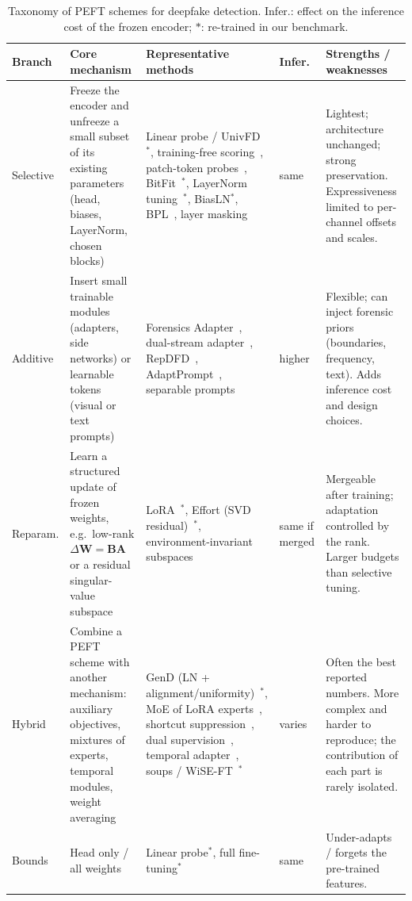 \documentclass[fonts]{icst}
\begin{document}
\begin{table}[!t]
\centering
\caption{Taxonomy of PEFT schemes for deepfake detection. Infer.: effect on the inference cost of the frozen encoder; $\ast$: re-trained in our benchmark.}
\label{tab:taxonomy}
\footnotesize
\begin{tabular}{>{\raggedright\arraybackslash}p{} >{\raggedright\arraybackslash}p{} >{\raggedright\arraybackslash}p{} >{\raggedright\arraybackslash}p{} >{\raggedright\arraybackslash}p{}}
\toprule
\textbf{Branch} & \textbf{Core mechanism} & \textbf{Representative methods} & \textbf{Infer.} & \textbf{Strengths / weaknesses} \\
\midrule
Selective & Freeze the encoder and unfreeze a small subset of its existing parameters (head, biases, LayerNorm, chosen blocks) & Linear probe / UnivFD~\cite{ojha2023universal}$^\ast$, training-free scoring~\cite{tsai2024trainingfree}, patch-token probes~\cite{abdullah2026tap}, BitFit~\cite{benzaken2022bitfit}$^\ast$, LayerNorm tuning~\cite{yermakov2025clip}$^\ast$, BiasLN$^\ast$, BPL~\cite{xu2026bpl}, layer masking~\cite{zhang2026layermask} & same & Lightest; architecture unchanged; strong preservation. Expressiveness limited to per-channel offsets and scales. \\
Additive & Insert small trainable modules (adapters, side networks) or learnable tokens (visual or text prompts) & Forensics Adapter~\cite{cui2025forada}, dual-stream adapter~\cite{liao2026dfa}, RepDFD~\cite{lin2025repdfd}, AdaptPrompt~\cite{jiang2026adaptprompt}, separable prompts~\cite{yang2026separable} & higher & Flexible; can inject forensic priors (boundaries, frequency, text). Adds inference cost and design choices. \\
Reparam. & Learn a structured update of frozen weights, e.g.\ low-rank $\Delta\mathbf{W}=\mathbf{B}\mathbf{A}$ or a residual singular-value subspace & LoRA~\cite{hu2022lora}$^\ast$, Effort (SVD residual)~\cite{yan2025effort}$^\ast$, environment-invariant subspaces~\cite{chen2026envsubspace} & same if merged & Mergeable after training; adaptation controlled by the rank. Larger budgets than selective tuning. \\
Hybrid & Combine a PEFT scheme with another mechanism: auxiliary objectives, mixtures of experts, temporal modules, weight averaging & GenD (LN + alignment/uniformity)~\cite{yermakov2025gend}$^\ast$, MoE of LoRA experts~\cite{liu2024mole}, shortcut suppression~\cite{wang2026shortcut}, dual supervision~\cite{zhang2026dino}, temporal adapter~\cite{han2024fcg}, soups / WiSE-FT~\cite{wortsman2022soups,wortsman2022wiseft}$^\ast$ & varies & Often the best reported numbers. More complex and harder to reproduce; the contribution of each part is rarely isolated. \\
\midrule
Bounds & Head only / all weights & Linear probe$^\ast$, full fine-tuning$^\ast$ & same & Under-adapts / forgets the pre-trained features. \\
\bottomrule
\end{tabular}
\end{table}
\end{document}
